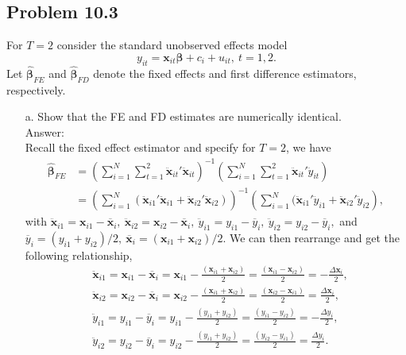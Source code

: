 \documentclass[10pt]{article}
\begin{document}
\subsection*{Problem 10.3}
For $T=2$ consider the standard unobserved effects model
\[y_{it}=\textbf{x}_{it}\pmb{\beta}+c_i+u_{it},\ t=1,2.\]
Let $\hat{\pmb{\beta}}_{FE}$ and $\hat{\pmb{\beta}}_{FD}$ denote the fixed effects and first difference estimators, respectively.
\begin{enumerate}
\item[a.] Show that the FE and FD estimates are numerically identical. 
\\ Answer: \\
Recall the fixed effect estimator and specify for $T=2$, we have
\begin{align*}
    \hat{\pmb{\beta}}_{FE}&=\left(\sum_{i=1}^N\sum_{t=1}^2\ddot{\textbf{x}}_{it}'\ddot{\textbf{x}}_{it}\right)^{-1}\left(\sum_{i=1}^N\sum_{t=1}^2\ddot{\textbf{x}}_{it}'\ddot{y}_{it}\right)\\
    &=\left(\sum_{i=1}^N(\ddot{\textbf{x}}_{i1}'\ddot{\textbf{x}}_{i1}+\ddot{\textbf{x}}_{i2}'\ddot{\textbf{x}}_{i2})\right)^{-1}\left(\sum_{i=1}^N(\ddot{\textbf{x}}_{i1}'\ddot{y}_{i1}+\ddot{\textbf{x}}_{i2}'\ddot{y}_{i2}\right),
\end{align*}
with $\ddot{\textbf{x}}_{i1}={\textbf{x}}_{i1}-\overline{\textbf{x}}_i,\ \ddot{\textbf{x}}_{i2}={\textbf{x}}_{i2}-\overline{\textbf{x}}_i,\ \ddot{y}_{i1}={y}_{i1}-\overline{y}_i,\ \ddot{y}_{i2}={y}_{i2}-\overline{y}_i,$ and $\overline{y}_i=(y_{i1}+y_{i2})/2,\ \overline{\textbf{x}}_i=(\textbf{x}_{i1}+\textbf{x}_{i2})/2$. We can then rearrange and get the following relationship,
\begin{align*}
    &\ddot{\textbf{x}}_{i1}={\textbf{x}}_{i1}-\overline{\textbf{x}}_i={\textbf{x}}_{i1}-\frac{(\textbf{x}_{i1}+\textbf{x}_{i2})}{2}=\frac{(\textbf{x}_{i1}-\textbf{x}_{i2})}{2}=-\frac{\Delta\textbf{x}_i}{2},\\
    &\ddot{\textbf{x}}_{i2}={\textbf{x}}_{i2}-\overline{\textbf{x}}_i={\textbf{x}}_{i2}-\frac{(\textbf{x}_{i1}+\textbf{x}_{i2})}{2}=\frac{(\textbf{x}_{i2}-\textbf{x}_{i1})}{2}=\frac{\Delta\textbf{x}_i}{2},\\ 
    &\ddot{y}_{i1}={y}_{i1}-\overline{y}_i={{y}}_{i1}-\frac{({y}_{i1}+{y}_{i2})}{2}=\frac{({y}_{i1}-{y}_{i2})}{2}=-\frac{\Delta {y}_i}{2},\\ 
    &\ddot{y}_{i2}={y}_{i2}-\overline{y}_i={{y}}_{i2}-\frac{({y}_{i1}+{y}_{i2})}{2}=\frac{({y}_{i2}-{y}_{i1})}{2}=\frac{\Delta {y}_i}{2}.
\end{align*}

\end{enumerate}
\end{document}
